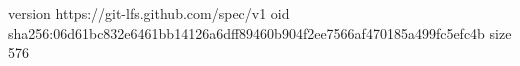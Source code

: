 version https://git-lfs.github.com/spec/v1
oid sha256:06d61bc832e6461bb14126a6dff89460b904f2ee7566af470185a499fc5efc4b
size 576
